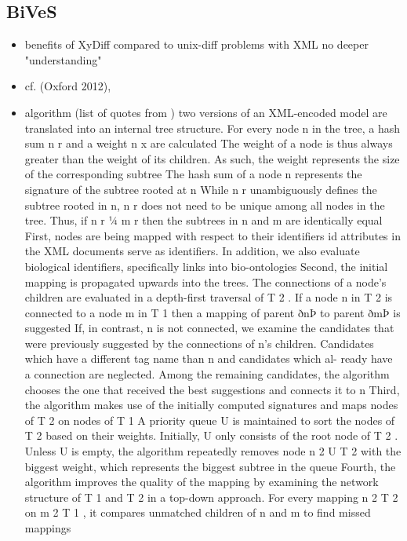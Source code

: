 	\subsection{BiVeS}
	\begin{itemize}
		\item benefits of XyDiff compared to unix-diff
		\subitem problems with XML
		\subitem no deeper "understanding"
		\item cf. \cite{Waltemath2013} (Oxford 2012), \cite{Scharm2015}
		\item algorithm (list of quotes from \cite{Scharm2015})
		\subitem two versions of an XML-encoded model are translated into an internal tree structure. For every node n in the tree, a hash sum n r and a weight n x are calculated 
		\subitem The weight of a node is thus always greater than the weight of its children. As such, the weight represents the size of the corresponding subtree 
		\subitem The hash sum of a node n represents the signature of the subtree rooted at n 
		\subitem While n r unambiguously defines the subtree rooted in n, n r does not need to be unique among all nodes in the tree. Thus, if n r ¼ m r then the subtrees in n and m are identically equal 
		\subitem First, nodes are being mapped with respect to their identifiers 
		\subitem id attributes in the XML documents serve as identifiers. In addition, we also evaluate biological identifiers, specifically links into bio-ontologies 
		\subitem Second, the initial mapping is propagated upwards into the trees. 
		\subitem The connections of a node’s children are evaluated in a depth-first traversal of T 2 . If a node n in T 2 is connected to a node m in T 1 then a mapping of parent ðnÞ to parent ðmÞ is suggested 
		\subitem If, in contrast, n is not connected, we examine the candidates that were previously suggested by the connections of n’s children. 
		\subitem Candidates which have a different tag name than n and candidates which al- ready have a connection are neglected. 
		\subitem Among the remaining candidates, the algorithm chooses the one that received the best suggestions and connects it to n 
		\subitem Third, the algorithm makes use of the initially computed signatures and maps nodes of T 2 on nodes of T 1 
		\subitem A priority queue U is maintained to sort the nodes of T 2 based on their weights. Initially, U only consists of the root node of T 2 . 
		\subitem Unless U is empty, the algorithm repeatedly removes node n 2 U  T 2 with the biggest weight, which represents the biggest subtree in the queue 
		\subitem Fourth, the algorithm improves the quality of the mapping by examining the network structure of T 1 and T 2 in a top-down approach. For every mapping n 2 T 2 on m 2 T 1 , it compares unmatched children of n and m to find missed mappings 

\end{itemize}
